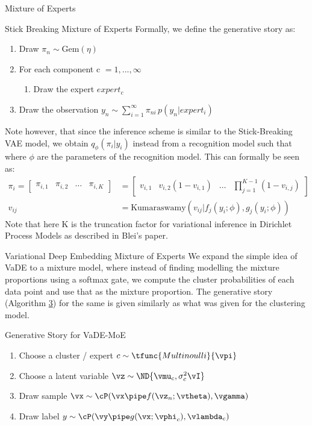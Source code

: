 \documentclass{article}
\begin{document}
\begin{psection}{Mixture of Experts}
\begin{psubsection}{Stick Breaking Mixture of Experts}
		Formally, we define the generative story as:
		\begin{enumerate}
			\item Draw $\pi_n \sim \text{Gem}(\eta)$
			\item For each component c $= 1,...,\infty$
				\begin{enumerate}
					\item Draw the expert $expert_c$
				\end{enumerate}
			\item Draw the observation $y_n \sim \sum_{i=1}^\infty \pi_{ni}\, p(y_n|expert_i)$
		\end{enumerate}

		Note however, that since the inference scheme is similar to the Stick-Breaking VAE model, we obtain $q_\phi(\pi_i|y_i)$ instead from a recognition model such that where $\phi$ are the parameters of the recognition model. This can formally be seen as:
		\begin{align*}
			\pi_i = \begin{bmatrix}
				\pi_{i,1} & \pi_{i,2} & \dots & \pi_{i,K}
			\end{bmatrix} &= \begin{bmatrix}
			v_{i,1} & v_{i,2}(1-v_{i,1}) & \dots & \prod_{j=1}^{K-1}(1-v_{i,j}) \end{bmatrix} \\
			v_{ij} &= \text{Kumaraswamy}(v_{ij}|f_j(y_i;\phi),g_j(y_i;\phi))
		\end{align*}
		Note that here K is the truncation factor for variational inference in Dirichlet Process Models as described in Blei's paper.

	\end{psubsection}

	\begin{psubsection}{Variational Deep Embedding Mixture of Experts}
		We expand the simple idea of VaDE to a mixture model, where instead of finding modelling the mixture proportions using a softmax gate, we compute the cluster probabilities of each data point and use that as the mixture proportion. The generative story (Algorithm \hyperlink{algo:3}{3}) for the same is given similarly as what was given for the clustering model.

		\begin{algo}[0.8\textwidth]{Generative Story for VaDE-MoE}

			\begin{enumerate}
				\item Choose a cluster / expert $c \sim \tfunc{Multinoulli}{\vpi}$
				\item Choose a latent variable $\vz \sim \ND{\vmu_c, \sigma_c^2 \vI}$
				\item Draw sample $\vx \sim \cP(\vx \pipe f(\vz_n; \vtheta), \vgamma)$
				\item Draw label $y \sim \cP(\vy \pipe g(\vx; \vphi_c), \vlambda_c)$
			\end{enumerate}


\end{algo}
\end{psubsection}
\end{psection}
\end{document}
